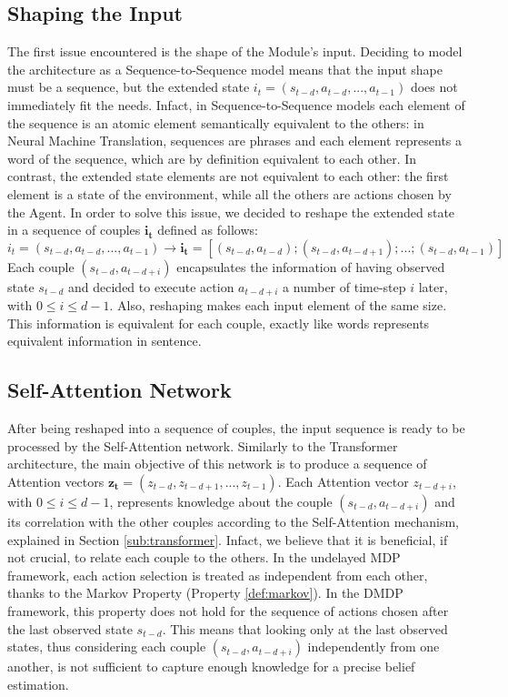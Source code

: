        \subsection{Shaping the Input}
            \label{sub:shape_input}
            The first issue encountered is the shape of the Module's input. Deciding to model the architecture as a Sequence-to-Sequence model means that the input shape must be a sequence, but the extended state $i_t = (s_{t-d}, a_{t-d}, ..., a_{t-1})$ does not immediately fit the needs. Infact, in Sequence-to-Sequence models each element of the sequence is an atomic element semantically equivalent to the others: in Neural Machine Translation, sequences are phrases and each element represents a word of the sequence, which are by definition equivalent to each other. In contrast, the extended state elements are not equivalent to each other: the first element is a state of the environment, while all the others are actions chosen by the Agent. In order to solve this issue, we decided to reshape the extended state in a sequence of couples $\mathbf{i_t}$ defined as follows:
            \[ i_t = (s_{t-d}, a_{t-d}, ..., a_{t-1}) \rightarrow \mathbf{i_t} =  \left[ (s_{t-d}, a_{t-d});  (s_{t-d}, a_{t-d+1}); ... ; (s_{t-d}, a_{t-1}) \right] \]
            Each couple $(s_{t-d}, a_{t-d+i})$ encapsulates the information of having observed state $s_{t-d}$ and decided to execute action $a_{t-d+i}$ a number of time-step $i$ later, with $0 \leq i \leq d - 1$. Also, reshaping makes each input element of the same size. This information is equivalent for each couple, exactly like words represents equivalent information in sentence.
            
        \subsection{Self-Attention Network}
            \label{sub:selfan}
            After being reshaped into a sequence of couples, the input sequence is ready to be processed by the Self-Attention network. Similarly to the Transformer architecture, the main objective of this network is to produce a sequence of Attention vectors $\mathbf{z_t} = (z_{t-d}, z_{t-d+1}, ..., z_{t-1})$. Each Attention vector $z_{t-d+i}$, with $0 \leq i \leq d-1$, represents knowledge about the couple $(s_{t-d}, a_{t-d+i})$ and its correlation with the other couples according to the Self-Attention mechanism, explained in Section \ref{sub:transformer}. Infact, we believe that it is beneficial, if not crucial, to relate each couple to the others. In the undelayed MDP framework, each action selection is treated as independent from each other, thanks to the Markov Property (Property \ref{def:markov}). In the DMDP framework, this property does not hold for the sequence of actions chosen after the last observed state $s_{t-d}$. This means that looking only at the last observed states, thus considering each couple $(s_{t-d}, a_{t-d+i})$ independently from one another, is not sufficient to capture enough knowledge for a precise belief estimation.
            
